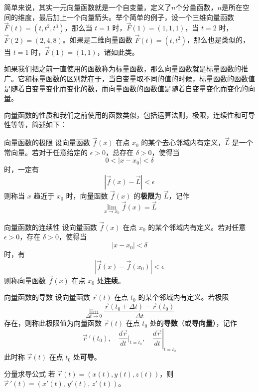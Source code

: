 简单来说，其实一元向量函数就是一个自变量，定义了\(n\)个分量函数，\(n\)是所在空间的维度，最后加上一个向量箭头。举个简单的例子，设一个三维向量函数 \(\vec{F}(t) = (t, t^2, t^3)\)，那么当 \(t=1\) 时，\(\vec{F}(1) = (1, 1, 1)\)，当 \(t=2\) 时，\(\vec{F}(2) = (2, 4, 8)\)。如果是二维向量函数 \(\vec{F}(t) = (t, t^2)\)，那么也是类似的，当 \(t=1\) 时，\(\vec{F}(1) = (1, 1)\)，诸如此类。

如果我们把之前一直使用的函数称为标量函数，那么向量函数就是标量函数的推广。它和标量函数的区别就在于，当自变量取不同的值的时候，标量函数的函数值是随着自变量变化而变化的数，而向量函数的函数值是随着自变量变化而变化的向量。

向量函数的性质和我们之前使用的函数类似，包括运算法则，极限，连续性和可导性等等，简述如下：

\begin{definition}{向量函数的极限}{}
设向量函数 \(\vec{f}(x)\) 在点 \(x_0\) 的某个去心邻域内有定义，\(\vec{L}\) 是一个常向量。若对于任意给定的 \(\epsilon > 0\)，总存在 \(\delta > 0\)，使得当  
\[
0 < |x - x_0| < \delta
\]  
时，一定有  
\[
|\vec{f}(x) - \vec{L}| < \epsilon
\]  
则称当 \(x\) 趋近于 \(x_0\) 时，向量函数 \(\vec{f}(x)\) 的\textbf{极限}为 \(\vec{L}\)，记作
\[
\lim_{x \to x_0} \vec{f}(x) = \vec{L}
\]
\end{definition}

\begin{definition}{向量函数的连续性}{}
设向量函数 \(\vec{f}(x)\) 在点 \(x_0\) 的某个邻域内有定义。若对任意 \(\epsilon > 0\)，存在 \(\delta > 0\)，使得当  
\[
|x - x_0| < \delta
\]  
时，有  
\[
|\vec{f}(x) - \vec{f}(x_0)| < \epsilon
\]  
则称向量函数 \(\vec{f}(x)\) 在点 \(x_0\) 处\textbf{连续}。
\end{definition}

\begin{definition}{向量函数的导数}{}
设向量函数 \(\vec{r}(t)\) 在点 \(t_0\) 的某个邻域内有定义。若极限  
\[
\lim_{\Delta t \to 0} \frac{\vec{r}(t_0 + \Delta t) - \vec{r}(t_0)}{\Delta t}
\]
存在，则称此极限值为向量函数 \(\vec{r}(t)\) 在点 \(t_0\) 处的\textbf{导数}（或\textbf{导向量}），记作  
\[
\vec{r}\,'(t_0), \quad \frac{d\vec{r}}{dt}\Big|_{t=t_0}, \quad \left.\frac{d\vec{r}}{dt}\right|_{t=t_0}
\]  
此时称 \(\vec{r}(t)\) 在点 \(t_0\) 处\textbf{可导}。
\end{definition}

\begin{theorem}{分量求导公式}{}
    若 \(\vec{r}(t) = (x(t), y(t), z(t))\)，则\(\vec{r}\,'(t) = ( x'(t),\, y'(t),\, z'(t) )\)。
\end{theorem}

